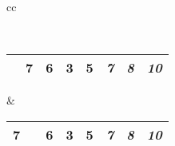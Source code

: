 \begin{tabular}{cc}
{{}}
\\
\begin{tabular}{|c|c|c|c|c||c|c|c|}
\hline
 \red{6} & 7 & 6 & 3 & 5 & \textit{7} & \textit{8} & \textit{10}\\
\hline
\end{tabular}
&
\begin{tabular}{|c|c|c|c|c||c|c|c|}
\hline
7 &  \red{6} & 6 & 3 & 5 & \textit{7} & \textit{8} & \textit{10}\\
\hline
\end{tabular}
\end{tabular}

